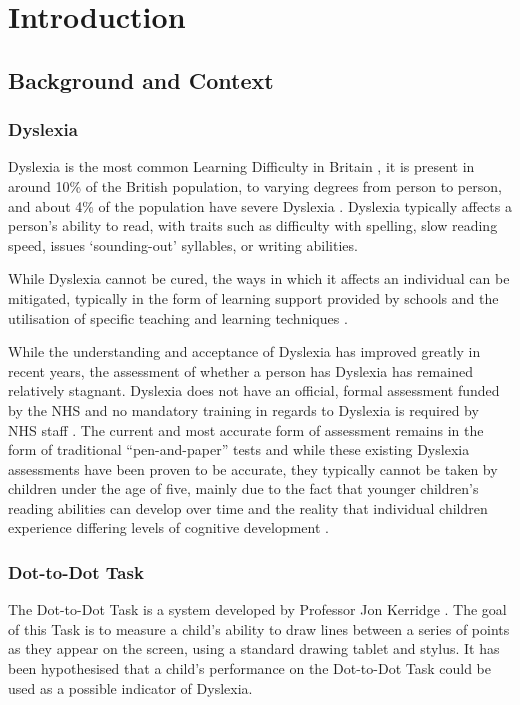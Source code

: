 \section{Introduction}
	\subsection{Background and Context}
		\subsubsection{Dyslexia}
			Dyslexia is the most common Learning Difficulty in Britain \cite{BritishDyslexiaAssociation, NHSChoices}, it is present in around 10\% of the British population, to varying degrees from person to person, and about 4\% of the population have severe Dyslexia . Dyslexia typically affects a person's ability to read, with traits such as difficulty with spelling, slow reading speed, issues ‘sounding-out’ syllables, or writing abilities.
			
			While Dyslexia cannot be cured, the ways in which it affects an individual can be mitigated, typically in the form of learning support provided by schools and the utilisation of specific teaching and learning techniques \cite{BritishDyslexiaAssociation2016}.
			
			While the understanding and acceptance of Dyslexia has improved greatly in recent years, the assessment of whether a person has Dyslexia has remained relatively stagnant. Dyslexia does not have an official, formal assessment funded by the NHS and no mandatory training in regards to Dyslexia is required by NHS staff \cite{NHSChoicesa} . The current and most accurate form of assessment remains in the form of traditional “pen-and-paper” tests \cite{BritishDyslexiaAssociation2016} and while these existing Dyslexia assessments have been proven to be accurate, they typically cannot be taken by children under the age of five, mainly due to the fact that younger children’s reading abilities can develop over time and the reality that individual children experience differing levels of cognitive development \cite{BritishDyslexiaAssociation}.
			

		\subsubsection{Dot-to-Dot Task}
			The Dot-to-Dot Task is a system developed by Professor Jon Kerridge \cite{Willis2010, Piotrowska2015}. The goal of this Task is to measure a child’s ability to draw lines between a series of points as they appear on the screen, using a standard drawing tablet and stylus. It has been hypothesised that a child's performance on the Dot-to-Dot Task could be used as a possible indicator of Dyslexia.
	
